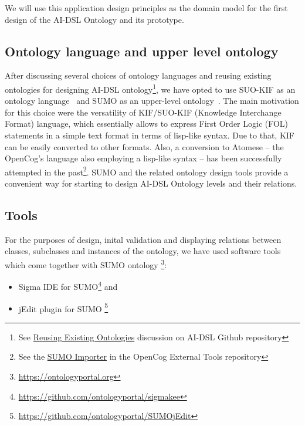 \documentclass[]{report}
\begin{document}
We will use this application design principles as the domain model for the first
design of the AI-DSL Ontology and its prototype.

\subsection{Ontology language and upper level ontology}

After discussing several choices of ontology languages and reusing existing
ontologies for designing AI-DSL ontology\footnote{See
\href{https://github.com/singnet/ai-dsl/discussions/18}{Reusing Existing
Ontologies} discussion on AI-DSL Github repository\cite{AIDSLRepo}}, we have opted to
use SUO-KIF as an ontology language~\cite{pease_standard_2009} and SUMO as an
upper-level ontology~\cite{NilesPease2001}. The main motivation for this choice
were the versatility of KIF/SUO-KIF (Knowledge Interchange Format) language,
which essentially allows to express First Order Logic (FOL) statements in a simple
text format in terms of lisp-like syntax. Due to that, KIF can be easily
converted to other formats\cite{kalibatiene_survey_2011}. Also, a conversion to
Atomese -- the OpenCog's language also employing a lisp-like syntax -- has been
successfully attempted in the past\footnote{See
the \href{https://github.com/opencog/external-tools/tree/master/SUMO_importer}{SUMO
  Importer} in the OpenCog External Tools
repository\cite{ExternalToolsRepo}}. SUMO and the related ontology design tools
\cite{pease_sigma_2001} provide a convenient way for starting to design AI-DSL
Ontology levels and their relations.

\subsection{Tools}

For the purposes of design, inital validation and displaying relations between
classes, subclasses and instances of the ontology, we have used software tools
which come together with SUMO ontology
\footnote{\href{https://ontologyportal.org}{https://ontologyportal.org}}:
\begin{itemize}
\item Sigma IDE for SUMO\footnote{\href{https://github.com/ontologyportal/sigmakee}
{https://github.com/ontologyportal/sigmakee}} and
\item jEdit plugin for SUMO
\footnote{\href{https://github.com/ontologyportal/SUMOjEdit}
{https://github.com/ontologyportal/SUMOjEdit}}
\end{itemize}
\end{document}
